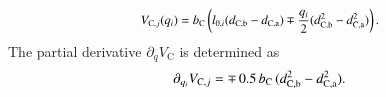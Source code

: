\begin{equation}\small
\begin{split}
     V_{\mathrm{C},j}(q_i) = b_\mathrm{C} \left ( l_{0,i} ( d_{\mathrm{C},\mathrm{b}}-d_{\mathrm{C},\mathrm{a}}) \mp \frac{q_i}{2} (d_{\mathrm{C},\mathrm{b}}^2 - d_{\mathrm{C},\mathrm{a}}^2) \right ).
\end{split}
\end{equation}
The partial derivative $\partial_{q} V_{\mathrm{C}}$ is determined as
\begin{equation}\small
    \partial_{q_i} V_{\mathrm{C},j} = \mp \, 0.5 \, b_\mathrm{C} \, (d_{\mathrm{C},\mathrm{b}}^2-d_{\mathrm{C},\mathrm{a}}^2).
\end{equation}

